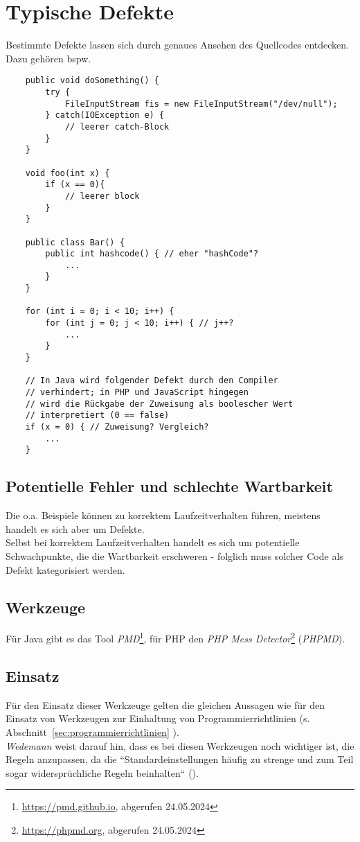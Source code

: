 \section{Typische Defekte}\label{sec:typische-defekte}

Bestimmte Defekte lassen sich durch genaues Ansehen des Quellcodes entdecken. Dazu gehören bspw.

\begin{verbatim}
    public void doSomething() {
        try {
            FileInputStream fis = new FileInputStream("/dev/null");
        } catch(IOException e) {
            // leerer catch-Block
        }
    }

    void foo(int x) {
        if (x == 0){
            // leerer block
        }
    }

    public class Bar() {
        public int hashcode() { // eher "hashCode"?
            ...
        }
    }

    for (int i = 0; i < 10; i++) {
        for (int j = 0; j < 10; i++) { // j++?
            ...
        }
    }

    // In Java wird folgender Defekt durch den Compiler
    // verhindert; in PHP und JavaScript hingegen
    // wird die Rückgabe der Zuweisung als boolescher Wert
    // interpretiert (0 == false)
    if (x = 0) { // Zuweisung? Vergleich?
        ...
    }
\end{verbatim}

\subsection*{Potentielle Fehler und schlechte Wartbarkeit}
Die o.a. Beispiele können zu korrektem Laufzeitverhalten führen, meistens handelt es sich aber um Defekte.\\
Selbst bei korrektem Laufzeitverhalten handelt es sich um potentielle Schwachpunkte, die die Wartbarkeit erschweren - folglich muss solcher Code als Defekt kategorisiert werden.

\subsection*{Werkzeuge}
Für Java gibt es das Tool \textit{PMD}\footnote{
    \url{https://pmd.github.io}, abgerufen 24.05.2024
}, für PHP den \textit{PHP Mess Detector}\footnote{
    \url{https://phpmd.org}, abgerufen 24.05.2024
} (\textit{PHPMD}).

\subsection*{Einsatz}
Für den Einsatz dieser Werkzeuge gelten die gleichen Aussagen wie für den Einsatz von Werkzeugen zur Einhaltung von Programmierrichtlinien (s. Abschnitt~\ref{sec:programmierrichtlinien}
).\\
\textit{Wedemann} weist darauf hin, dass es bei diesen Werkzeugen noch wichtiger ist, die Regeln anzupassen, da die ``Standardeinstellungen häufig zu strenge und zum Teil sogar widersprüchliche Regeln beinhalten`` (\cite[31]{Wed09c}).

